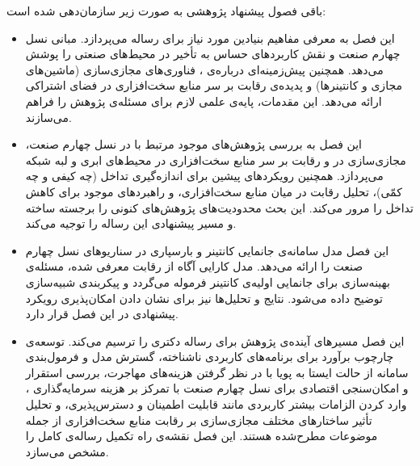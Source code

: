 باقی‌ فصول پیشنهاد پژوهشی به صورت زیر سازمان‌دهی شده است:
\begin{itemize}
\item
\textbf{}
این فصل به معرفی مفاهیم بنیادین مورد نیاز برای رساله می‌پردازد. مبانی نسل چهارم صنعت و نقش کاربردهای حساس به تأخیر در محیط‌های صنعتی را پوشش می‌دهد. همچنین پیش‌زمینه‌ای درباره‌ی ، فناوری‌های مجازی‌سازی (ماشین‌های مجازی و کانتینرها) و پدیده‌ی رقابت بر سر منابع سخت‌افزاری در فضای اشتراکی ارائه می‌دهد. این مقدمات، پایه‌ی علمی لازم برای مسئله‌ی پژوهش را فراهم می‌سازند.

\item
\textbf{}
این فصل به بررسی پژوهش‌های موجود مرتبط با  در نسل چهارم صنعت، مجازی‌سازی در  و رقابت بر سر منابع سخت‌افزاری در محیط‌های ابری و لبه‌ شبکه می‌پردازد. همچنین رویکردهای پیشین برای اندازه‌گیری تداخل (چه کیفی و چه کمّی)، تحلیل رقابت در میان منابع سخت‌افزاری، و راهبردهای موجود برای کاهش تداخل را مرور می‌کند. این بحث محدودیت‌های پژوهش‌های کنونی را برجسته ساخته و مسیر پیشنهادی این رساله را توجیه می‌کند.

\item
\textbf{}
این فصل مدل سامانه‌ی جانمایی کانتینر و بارسپاری در سناریوهای  نسل چهارم صنعت را ارائه می‌دهد. مدل کارایی آگاه از رقابت معرفی شده، مسئله‌ی بهینه‌سازی برای جانمایی اولیه‌ی کانتینر فرموله می‌گردد و پیکربندی شبیه‌سازی توضیح داده می‌شود. نتایج و تحلیل‌ها نیز برای نشان دادن امکان‌پذیری رویکرد پیشنهادی در این فصل قرار دارد.

\item
\textbf{}
این فصل مسیرهای آینده‌ی پژوهش برای رساله دکتری را ترسیم می‌کند. توسعه‌ی چارچوب برآورد برای برنامه‌های کاربردی ناشناخته، گسترش مدل و فرمول‌بندی سامانه از حالت ایستا به پویا با در نظر گرفتن هزینه‌های مهاجرت، بررسی استقرار و امکان‌سنجی اقتصادی  برای نسل چهارم صنعت با تمرکز بر هزینه سرمایه‌گذاری ، وارد کردن الزامات بیشتر کاربردی مانند قابلیت اطمینان و دسترس‌پذیری، و تحلیل تأثیر ساختارهای مختلف مجازی‌سازی بر رقابت منابع سخت‌افزاری از جمله موضوعات مطرح‌شده هستند. این فصل نقشه‌ی راه تکمیل رساله‌ی کامل را مشخص می‌سازد.

\end{itemize}
